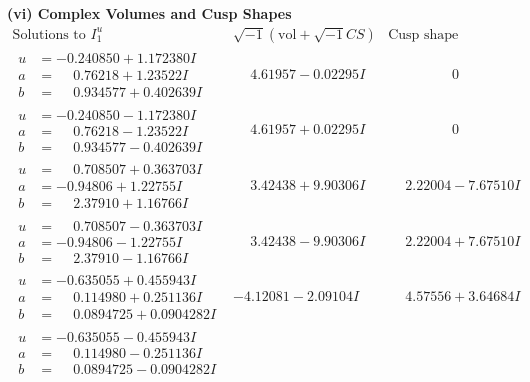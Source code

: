 \documentclass[1p]{elsarticle_modified}
\theoremstyle{definition}
\newcommand{\I}{\sqrt{-1}}
\begin{document}
\newpage\flushleft \textbf{(vi) Complex Volumes and Cusp Shapes}
$$\begin{array}{c|c|c}  
\text{Solutions to }I^u_{1}& \I (\text{vol} + \sqrt{-1}CS) & \text{Cusp shape}\\
 \hline 
\begin{aligned}
u &= -0.240850 + 1.172380 I \\
a &= \phantom{-}0.76218 + 1.23522 I \\
b &= \phantom{-}0.934577 + 0.402639 I\end{aligned}
 & \phantom{-}4.61957 - 0.02295 I & \phantom{-0.000000 } 0 \\ \hline\begin{aligned}
u &= -0.240850 - 1.172380 I \\
a &= \phantom{-}0.76218 - 1.23522 I \\
b &= \phantom{-}0.934577 - 0.402639 I\end{aligned}
 & \phantom{-}4.61957 + 0.02295 I & \phantom{-0.000000 } 0 \\ \hline\begin{aligned}
u &= \phantom{-}0.708507 + 0.363703 I \\
a &= -0.94806 + 1.22755 I \\
b &= \phantom{-}2.37910 + 1.16766 I\end{aligned}
 & \phantom{-}3.42438 + 9.90306 I & \phantom{-}2.22004 - 7.67510 I \\ \hline\begin{aligned}
u &= \phantom{-}0.708507 - 0.363703 I \\
a &= -0.94806 - 1.22755 I \\
b &= \phantom{-}2.37910 - 1.16766 I\end{aligned}
 & \phantom{-}3.42438 - 9.90306 I & \phantom{-}2.22004 + 7.67510 I \\ \hline\begin{aligned}
u &= -0.635055 + 0.455943 I \\
a &= \phantom{-}0.114980 + 0.251136 I \\
b &= \phantom{-}0.0894725 + 0.0904282 I\end{aligned}
 & -4.12081 - 2.09104 I & \phantom{-}4.57556 + 3.64684 I \\ \hline\begin{aligned}
u &= -0.635055 - 0.455943 I \\
a &= \phantom{-}0.114980 - 0.251136 I \\
b &= \phantom{-}0.0894725 - 0.0904282 I\end{aligned}

\end{array}$$
\end{document}
